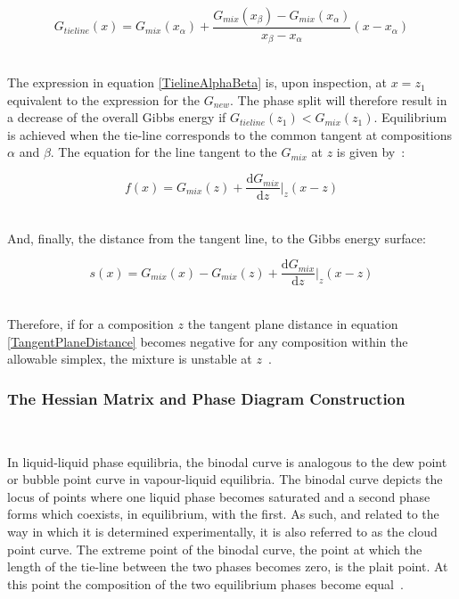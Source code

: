 \begin{equation}
G_{tieline}\left(x\right) = G_{mix}\left(x_{\alpha}\right) + \dfrac{G_{mix}\left(x_{\beta}\right) - G_{mix}\left(x_{\alpha}\right)}{x_{\beta}-x_{\alpha}}\left(x - x_{\alpha}\right) \label{TielineAlphaBeta}
\end{equation}\

The expression in equation \ref{TielineAlphaBeta} is, upon inspection, at $x = z_{1}$ equivalent to the expression for the $G_{new}$. The phase split will therefore result in a decrease of the overall Gibbs energy if $G_{tieline}\left(z_{1}\right) < G_{mix}\left(z_{1}\right)$. Equilibrium is achieved when the tie-line corresponds to the common tangent at compositions $\alpha$ and $\beta$. The equation for the line tangent to the $G_{mix}$ at $z$ is given by~\cite{ThermodynamicModels}:\

\begin{equation}
f\left(x\right) = G_{mix}\left(z\right) + \dfrac{\mathrm{d}G_{mix}}{\mathrm{d}z}\vert_{z}\left(x-z\right) \label{Tangent}
\end{equation}\

And, finally, the distance from the tangent line, to the Gibbs energy surface:\

\begin{equation}
s\left(x\right) = G_{mix}\left(x\right) -  G_{mix}\left(z\right) + \dfrac{\mathrm{d}G_{mix}}{\mathrm{d}z}\vert_{z}\left(x-z\right) \label{TangentPlaneDistance}
\end{equation}\

Therefore, if for a composition $z$ the tangent plane distance in equation \ref{TangentPlaneDistance} becomes negative for any composition within the allowable simplex, the mixture is unstable at $z$~\cite{ThermodynamicModels}.\

\subsubsection{The Hessian Matrix and Phase Diagram Construction}\
	
In liquid-liquid phase equilibria, the binodal curve is analogous to the dew point or bubble point curve in vapour-liquid equilibria. The binodal curve depicts the locus of points where one liquid phase becomes saturated and a second phase forms which coexists, in equilibrium, with the first. As such, and related to the way in which it is determined experimentally, it is also referred to as the cloud point curve. The extreme point of the binodal curve, the point at which the length of the tie-line between the two phases becomes zero, is the plait point. At this point the composition of the two equilibrium phases become equal~\cite{ChemicalBiochemicalEngineeringThermodynamics}.\\

